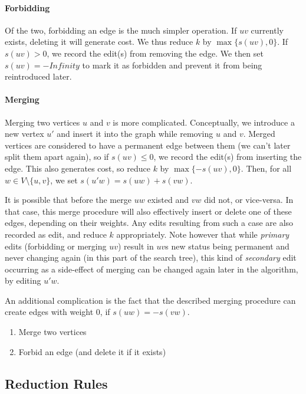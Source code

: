 \documentclass{article}
\begin{document}
\paragraph{Forbidding} Of the two, forbidding an edge is the much simpler operation. If $uv$
currently exists, deleting it will generate cost. We thus reduce $k$ by $\max\{s(uv), 0\}$. If $s(uv)
> 0$, we record the edit(s) from removing the edge. We then set $s(uv) = -Infinity$ to mark it as
forbidden and prevent it from being reintroduced later.

\paragraph{Merging} Merging two vertices $u$ and $v$ is more complicated. Conceptually, we introduce
a new vertex $u'$ and insert it into the graph while removing $u$ and $v$. Merged vertices are
considered to have a permanent edge between them (we can't later split them apart again), so if
$s(uv) \leq 0$, we record the edit(s) from inserting the edge. This also generates cost, so reduce
$k$ by $\max\{-s(uv), 0\}$. Then, for all $w \in V \setminus \{u, v\}$, we set $s(u'w) = s(uw) +
s(vw)$.

It is possible that before the merge $uw$ existed and $vw$ did not, or vice-versa. In that case,
this merge procedure will also effectively insert or delete one of these edges, depending on their
weights. Any edits resulting from such a case are also recorded as edit, and reduce $k$
appropriately. Note however that while \emph{primary} edits (forbidding or merging $uv$) result in
$uv$s new status being permanent and never changing again (in this part of the search tree), this
kind of \emph{secondary} edit occurring as a side-effect of merging can be changed again later in
the algorithm, by editing $u'w$.

An additional complication is the fact that the described merging procedure can create edges with
weight 0, if $s(uw) = -s(vw)$.

\begin{enumerate}
	\item Merge two vertices
	\item Forbid an edge (and delete it if it exists)
\end{enumerate}

\subsection{Reduction Rules}
\end{document}
